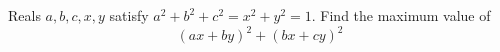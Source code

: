 Reals $a,b,c,x,y$ satisfy $a^2+b^2+c^2=x^2+y^2=1$. Find the maximum value of $$(ax+by)^2+(bx+cy)^2$$